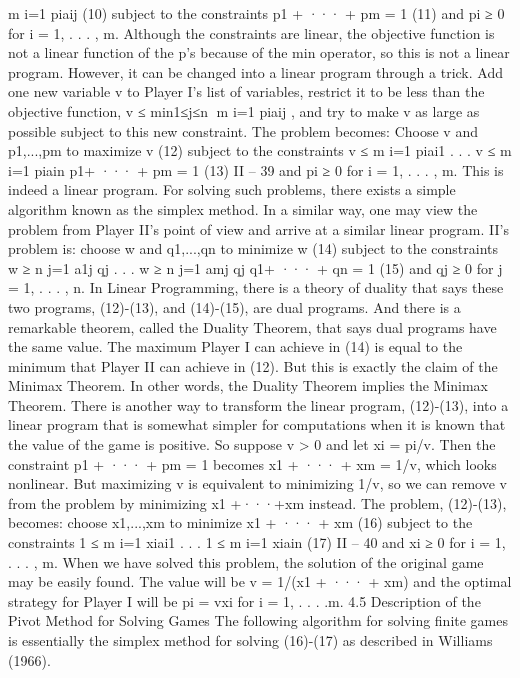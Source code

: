 \documentclass[]{report}
\begin{document}
m
i=1
piaij (10)
subject to the constraints
p1 + ··· + pm = 1 (11)
and
pi ≥ 0 for i = 1, . . . , m.
Although the constraints are linear, the objective function is not a linear function of
the p’s because of the min operator, so this is not a linear program. However, it can be
changed into a linear program through a trick. Add one new variable v to Player I’s list of
variables, restrict it to be less than the objective function, v ≤ min1≤j≤n
m
i=1 piaij , and
try to make v as large as possible subject to this new constraint. The problem becomes:
Choose v and p1,...,pm to
maximize v (12)
subject to the constraints
v ≤ 
m
i=1
piai1
.
.
.
v ≤ 
m
i=1
piain
p1+ ··· + pm = 1
(13)
II – 39
and
pi ≥ 0 for i = 1, . . . , m.
This is indeed a linear program. For solving such problems, there exists a simple algorithm
known as the simplex method.
In a similar way, one may view the problem from Player II’s point of view and arrive
at a similar linear program. II’s problem is: choose w and q1,...,qn to
minimize w (14)
subject to the constraints
w ≥ 
n
j=1
a1j qj
.
.
.
w ≥ 
n
j=1
amj qj
q1+ ··· + qn = 1
(15)
and
qj ≥ 0 for j = 1, . . . , n.
In Linear Programming, there is a theory of duality that says these two programs,
(12)-(13), and (14)-(15), are dual programs. And there is a remarkable theorem, called the
Duality Theorem, that says dual programs have the same value. The maximum Player I
can achieve in (14) is equal to the minimum that Player II can achieve in (12). But this is
exactly the claim of the Minimax Theorem. In other words, the Duality Theorem implies
the Minimax Theorem.
There is another way to transform the linear program, (12)-(13), into a linear program
that is somewhat simpler for computations when it is known that the value of the game
is positive. So suppose v > 0 and let xi = pi/v. Then the constraint p1 + ··· + pm = 1
becomes x1 + ··· + xm = 1/v, which looks nonlinear. But maximizing v is equivalent to
minimizing 1/v, so we can remove v from the problem by minimizing x1 +···+xm instead.
The problem, (12)-(13), becomes: choose x1,...,xm to
minimize x1 + ··· + xm (16)
subject to the constraints
1 ≤ 
m
i=1
xiai1
.
.
.
1 ≤ 
m
i=1
xiain
(17)
II – 40
and
xi ≥ 0 for i = 1, . . . , m.
When we have solved this problem, the solution of the original game may be easily found.
The value will be v = 1/(x1 + ··· + xm) and the optimal strategy for Player I will be
pi = vxi for i = 1, . . . .m.
4.5 Description of the Pivot Method for Solving Games The following algorithm
for solving finite games is essentially the simplex method for solving (16)-(17) as
described in Williams (1966).
\end{document}
